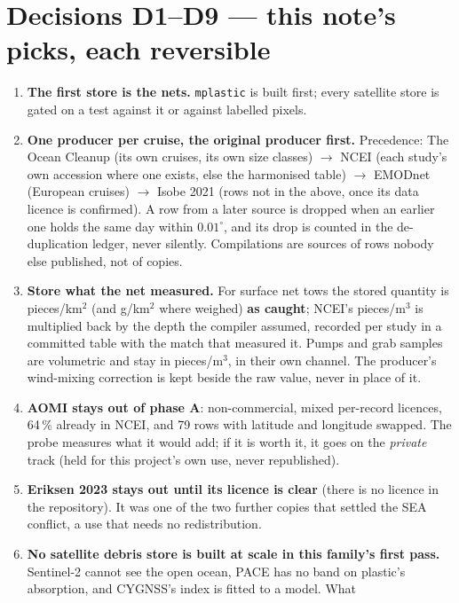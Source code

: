 \documentclass[10pt]{article}
\newcommand{\code}[1]{\texttt{#1}}
\begin{document}
\section{Decisions D1--D9 --- this note's picks, each reversible}
\label{sec:decisions}

\begin{enumerate}\itemsep2pt
\item[\textbf{D1}] \textbf{The first store is the nets.} \code{mplastic} is built first; every satellite store is
gated on a test against it or against labelled pixels.
\item[\textbf{D2}] \textbf{One producer per cruise, the original producer first.} Precedence: The Ocean Cleanup
(its own cruises, its own size classes) $\to$ NCEI (each study's own accession where one exists, else the
harmonised table) $\to$ EMODnet (European cruises) $\to$ Isobe 2021 (rows not in the above, once its data licence is
confirmed). A row from a later source is dropped when an earlier one holds the same day within $0.01^\circ$, and
its drop is counted in the de-duplication ledger, never silently. Compilations are sources of rows nobody else
published, not of copies.
\item[\textbf{D3}] \textbf{Store what the net measured.} For surface net tows the stored quantity is pieces/km$^2$
(and g/km$^2$ where weighed) \textbf{as caught}; NCEI's pieces/m$^3$ is multiplied back by the depth the compiler
assumed, recorded per study in a committed table with the match that measured it. Pumps and grab samples are
volumetric and stay in pieces/m$^3$, in their own channel. The producer's wind-mixing correction is kept beside the
raw value, never in place of it.
\item[\textbf{D4}] \textbf{AOMI stays out of phase A}: non-commercial, mixed per-record licences, 64\,\% already in
NCEI, and 79 rows with latitude and longitude swapped. The probe measures what it would add; if it is worth it, it
goes on the \emph{private} track (held for this project's own use, never republished).
\item[\textbf{D5}] \textbf{Eriksen 2023 stays out until its licence is clear} (there is no licence in the
repository). It was one of the two further copies that settled the SEA conflict, a use that needs no redistribution.
\item[\textbf{D6}] \textbf{No satellite debris store is built at scale in this family's first pass.} Sentinel-2
cannot see the open ocean, PACE has no band on plastic's absorption, and CYGNSS's index is fitted to a model. What

\end{enumerate}
\end{document}
